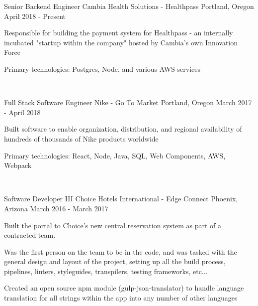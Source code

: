
\begin{cventries}

  \cventry
  {Senior Backend Engineer}
  {Cambia Health Solutions - Healthpass}
  {Portland, Oregon}
  {April 2018 - Present}
  {
    \begin{cvitems}
      \item {Responsible for building the payment system for Healthpass - an internally incubated "startup within the company" hosted by Cambia's own Innovation Force}
      \item {Primary technologies: Postgres, Node, and various AWS services}
    \end{cvitems}
  }

  ~

  \cventry
  {Full Stack Software Engineer}
  {Nike - Go To Market}
  {Portland, Oregon}
  {March 2017 - April 2018}
  {
    \begin{cvitems}
      \item {Built software to enable organization, distribution, and regional availability of hundreds of thousands of Nike products worldwide}
      \item {Primary technologies: React, Node, Java, SQL, Web Components, AWS, Webpack}
    \end{cvitems}
  }

  ~



  \cventry
    {Software Developer III}
    {Choice Hotels International - Edge Connect}
    {Phoenix, Arizona}
    {March 2016 - March 2017}
    {
      \begin{cvitems}
        \item {Built the portal to Choice's new central reservation system as part of a contracted team.}
        \item {Was the first person on the team to be in the code, and was tasked with the general design and layout of the project, setting up all the build process, pipelines, linters, styleguides, transpilers, testing frameworks, etc...}
        \item {Created an open source npm module (gulp-json-translator) to handle language translation for all strings within the app into any number of other languages}
      \end{cvitems}
    }


\end{cventries}
